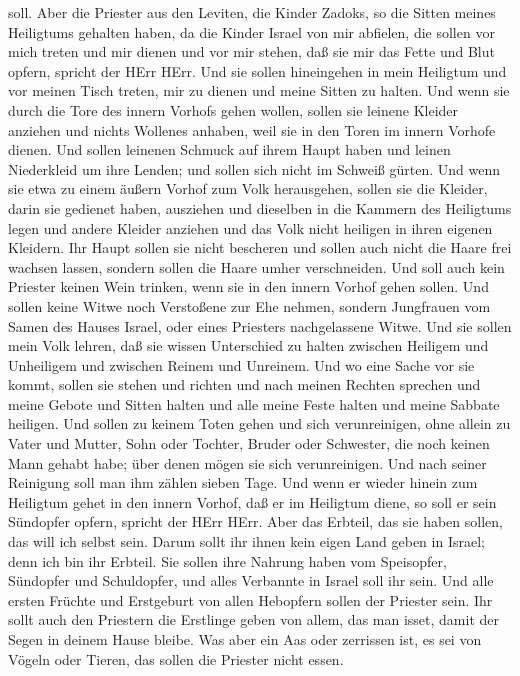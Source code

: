soll.  Aber die Priester aus den Leviten, die Kinder
Zadoks, so die Sitten meines Heiligtums gehalten haben, da die Kinder
Israel von mir abfielen, die sollen vor mich treten und mir dienen und
vor mir stehen, daß sie mir das Fette und Blut opfern, spricht der HErr
HErr.  Und sie sollen hineingehen in mein Heiligtum und vor
meinen Tisch treten, mir zu dienen und meine Sitten zu halten.
 Und wenn sie durch die Tore des innern Vorhofs gehen
wollen, sollen sie leinene Kleider anziehen und nichts Wollenes anhaben,
weil sie in den Toren im innern Vorhofe dienen.  Und sollen
leinenen Schmuck auf ihrem Haupt haben und leinen Niederkleid um ihre
Lenden; und sollen sich nicht im Schweiß gürten.  Und wenn
sie etwa zu einem äußern Vorhof zum Volk herausgehen, sollen sie die
Kleider, darin sie gedienet haben, ausziehen und dieselben in die
Kammern des Heiligtums legen und andere Kleider anziehen und das Volk
nicht heiligen in ihren eigenen Kleidern.  Ihr Haupt sollen
sie nicht bescheren und sollen auch nicht die Haare frei wachsen lassen,
sondern sollen die Haare umher verschneiden.  Und soll auch
kein Priester keinen Wein trinken, wenn sie in den innern Vorhof gehen
sollen.  Und sollen keine Witwe noch Verstoßene zur Ehe
nehmen, sondern Jungfrauen vom Samen des Hauses Israel, oder eines
Priesters nachgelassene Witwe.  Und sie sollen mein Volk
lehren, daß sie wissen Unterschied zu halten zwischen Heiligem und
Unheiligem und zwischen Reinem und Unreinem.  Und wo eine
Sache vor sie kommt, sollen sie stehen und richten und nach meinen
Rechten sprechen und meine Gebote und Sitten halten und alle meine Feste
halten und meine Sabbate heiligen.  Und sollen zu keinem
Toten gehen und sich verunreinigen, ohne allein zu Vater und Mutter,
Sohn oder Tochter, Bruder oder Schwester, die noch keinen Mann gehabt
habe; über denen mögen sie sich verunreinigen.  Und nach
seiner Reinigung soll man ihm zählen sieben Tage.  Und wenn
er wieder hinein zum Heiligtum gehet in den innern Vorhof, daß er im
Heiligtum diene, so soll er sein Sündopfer opfern, spricht der HErr
HErr.  Aber das Erbteil, das sie haben sollen, das will ich
selbst sein. Darum sollt ihr ihnen kein eigen Land geben in Israel; denn
ich bin ihr Erbteil.  Sie sollen ihre Nahrung haben vom
Speisopfer, Sündopfer und Schuldopfer, und alles Verbannte in Israel
soll ihr sein.  Und alle ersten Früchte und Erstgeburt von
allen Hebopfern sollen der Priester sein. Ihr sollt auch den Priestern
die Erstlinge geben von allem, das man isset, damit der Segen in deinem
Hause bleibe.  Was aber ein Aas oder zerrissen ist, es sei
von Vögeln oder Tieren, das sollen die Priester nicht essen.

